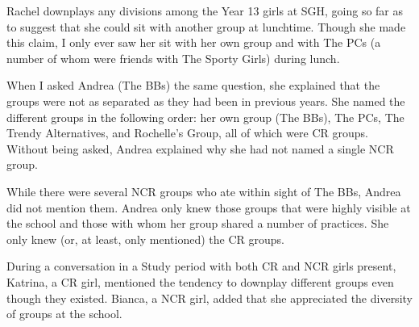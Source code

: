 \noindent Rachel downplays any divisions among the Year 13 girls at SGH, going so far as to suggest that she could sit with another group at lunchtime. Though she made this claim, I only ever saw her sit with her own group and with The PCs (a number of whom were friends with The Sporty Girls) during lunch. 

When I asked Andrea (The BBs) the same question, she explained that the groups were not as separated as they had been in previous years. She named the different groups in the following order: her own group (The BBs), The PCs, The Trendy Alternatives, and Rochelle's Group, all of which were CR groups. Without being asked, Andrea explained why she had not named a single NCR group.

\label{ex:thispartoflawn}

\vspace{5 mm}

\noindent While there were several NCR groups who ate within sight of The BBs, Andrea did not mention them. Andrea only knew those groups that were highly visible at the school and those with whom her group shared a number of practices. She only knew (or, at least, only mentioned) the CR groups.

During a conversation in a Study period with both CR and NCR girls present, Katrina, a CR girl, mentioned the tendency to downplay different groups even though they existed. Bianca, a NCR girl, added that she appreciated the diversity of groups at the school.

\label{cliques}

